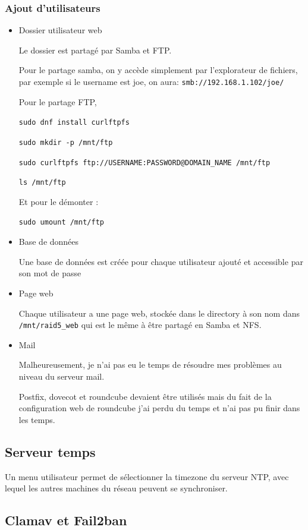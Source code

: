 \documentclass{article}
\begin{document}
\subsubsection{Ajout d'utilisateurs}
\begin{itemize}
\item Dossier utilisateur web

Le dossier est partagé par Samba et FTP.

Pour le partage samba, on y accède simplement par l'explorateur de fichiers, par exemple si le username est joe, on aura: \texttt{smb://192.168.1.102/joe/}  

Pour le partage FTP, 

\texttt{sudo dnf install curlftpfs}


\texttt{sudo mkdir -p /mnt/ftp}


\texttt{sudo curlftpfs ftp://USERNAME:PASSWORD@DOMAIN\_NAME /mnt/ftp}


\texttt{ls /mnt/ftp}


Et pour le démonter :


\texttt{sudo umount /mnt/ftp}

\item Base de données

Une base de données est créée pour chaque utilisateur ajouté et accessible par son mot de passe
\item Page web

Chaque utilisateur a une page web, stockée dans le directory à son nom dans \texttt{/mnt/raid5\_web} qui est le même à être partagé en Samba et NFS.

\item Mail

Malheureusement, je n'ai pas eu le temps de résoudre mes problèmes au niveau du serveur mail.

Postfix, dovecot et roundcube devaient être utilisés mais du fait de la configuration web de roundcube j'ai perdu du temps et n'ai pas pu finir dans les temps.

\end{itemize}


\subsection{Serveur temps}

Un menu utilisateur permet de sélectionner la timezone du serveur NTP, avec lequel les autres machines du réseau peuvent se synchroniser.

\subsection{Clamav et Fail2ban}
\end{document}
